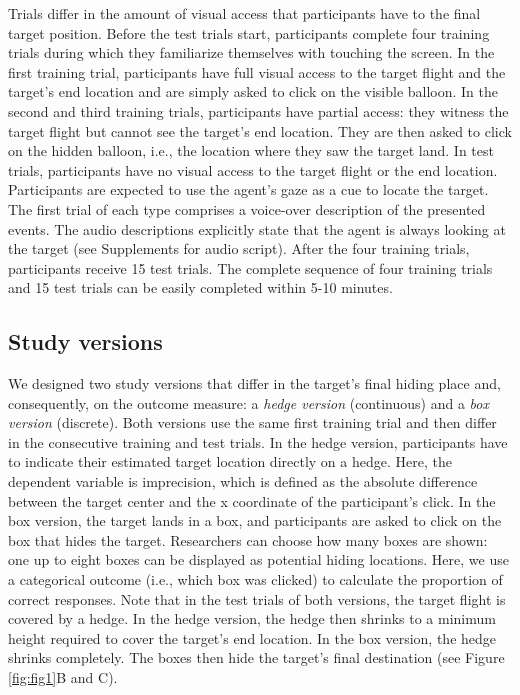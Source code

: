 \documentclass[
  man,floatsintext]{apa6}
\begin{document}
Trials differ in the amount of visual access that participants have to the final target position.
Before the test trials start, participants complete four training trials during which they familiarize themselves with touching the screen.
In the first training trial, participants have full visual access to the target flight and the target's end location and are simply asked to click on the visible balloon.
In the second and third training trials, participants have partial access: they witness the target flight but cannot see the target's end location.
They are then asked to click on the hidden balloon, i.e., the location where they saw the target land.
In test trials, participants have no visual access to the target flight or the end location.
Participants are expected to use the agent's gaze as a cue to locate the target.
The first trial of each type comprises a voice-over description of the presented events.
The audio descriptions explicitly state that the agent is always looking at the target (see Supplements for audio script).
After the four training trials, participants receive 15 test trials.
The complete sequence of four training trials and 15 test trials can be easily completed within 5-10 minutes.

\hypertarget{study-versions}{%
\subsection{Study versions}\label{study-versions}}

We designed two study versions that differ in the target's final hiding place and, consequently, on the outcome measure: a \emph{hedge version} (continuous) and a \emph{box version} (discrete).
Both versions use the same first training trial and then differ in the consecutive training and test trials.
In the hedge version, participants have to indicate their estimated target location directly on a hedge.
Here, the dependent variable is imprecision, which is defined as the absolute difference between the target center and the x coordinate of the participant's click.
In the box version, the target lands in a box, and participants are asked to click on the box that hides the target.
Researchers can choose how many boxes are shown: one up to eight boxes can be displayed as potential hiding locations.
Here, we use a categorical outcome (i.e., which box was clicked) to calculate the proportion of correct responses.
Note that in the test trials of both versions, the target flight is covered by a hedge.
In the hedge version, the hedge then shrinks to a minimum height required to cover the target's end location.
In the box version, the hedge shrinks completely.
The boxes then hide the target's final destination (see Figure \ref{fig:fig1}B and C).
\end{document}
